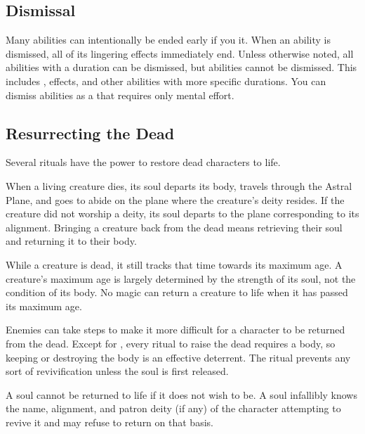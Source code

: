     \subsection{Dismissal}\label{Dismissal}
        Many abilities can intentionally be ended early if you  it.
        When an ability is dismissed, all of its lingering effects immediately end.
        Unless otherwise noted, all  abilities with a duration can be dismissed, but  abilities cannot be dismissed.
        This includes ,  effects, and other abilities with more specific durations.
        You can dismiss abilities as a  that requires only mental effort.

    \subsection{Resurrecting the Dead}\label{Resurrecting the Dead}
        Several rituals have the power to restore dead characters to life.

        When a living creature dies, its soul departs its body, travels through the Astral Plane, and goes to abide on the plane where the creature's deity resides.
        If the creature did not worship a deity, its soul departs to the plane corresponding to its alignment.
        Bringing a creature back from the dead means retrieving their soul and returning it to their body.

         While a creature is dead, it still tracks that time towards its maximum age.
        A creature's maximum age is largely determined by the strength of its soul, not the condition of its body.
        No magic can return a creature to life when it has passed its maximum age.

         Enemies can take steps to make it more difficult for a character to be returned from the dead.
        Except for , every ritual to raise the dead requires a body, so keeping or destroying the body is an effective deterrent.
        The  ritual prevents any sort of revivification unless the soul is first released.

         A soul cannot be returned to life if it does not wish to be.
        A soul infallibly knows the name, alignment, and patron deity (if any) of the character attempting to revive it and may refuse to return on that basis.

